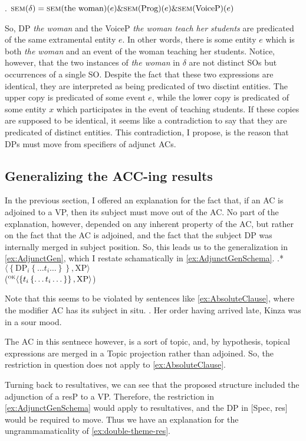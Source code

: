 \documentclass[MilwayThesis]{subfiles}
\begin{document}
\ex.\label{ex:AdjunctSEM} $\textsc{sem}(\delta) = \textsc{sem}(\text{the woman})(e) \& \textsc{sem}(\text{Prog})(e) \& \textsc{sem}(\text{VoiceP})(e)$

So, DP \textit{the woman} and the VoiceP \textit{the woman teach her students} are predicated of the same extramental entity $e$.
In other words, there is some entity $e$ which is both \textit{the woman} and an event of the woman teaching her students.
Notice, however, that the two instances of \textit{the woman} in $\delta$ are not distinct SOs but occurrences of a single SO.
Despite the fact that these two expressions are identical, they are interpreted as being predicated of two disctint entities.
The upper copy is predicated of some event $e$, while the lower copy is predicated of some entity $x$ which participates in the event of teaching students.
If these copies are supposed to be identical, it seems like a contradiction to say that they are predicated of distinct entities.
This contradiction, I propose, is the reason that DPs must move from specifiers of adjunct ACs.
\subsection{Generalizing the ACC-ing results}
In the previous section, I offered an explanation for the fact that, if an AC is adjoined to a VP, then its subject must move out of the AC.
No part of the explanation, however, depended on any inherent property of the AC, but rather on the fact that the AC is adjoined, and the fact that the subject DP was internally merged in subject position. 
So, this leads us to the generalization in \cref{ex:AdjunctGen}, which I restate schamatically in \cref{ex:AdjunctGenSchema}.
\ex.* $\langle \left\{ \text{DP}_{i} \left\{ \dots t_i \dots \right\} \right\}, \text{XP}\rangle$\label{ex:AdjunctGenSchema}\\
($^\textsc{ok}\langle \left\{ t_{i} \left\{ \dots t_i \dots \right\} \right\}, \text{XP}\rangle$)

Note that this seems to be violated by sentences like \cref{ex:AbsoluteClause}, where the modifier AC has its subject in situ.
\ex. Her order having arrived late, Kinza was in a sour mood.\label{ex:AbsoluteClause}

The AC in this sentnece however, is a sort of topic, and, by hypothesis, topical expressions are merged in a Topic projection rather than adjoined.
So, the restriction in question does not apply to \cref{ex:AbsoluteClause}.

Turning back to resultatives, we can see that the proposed structure included the adjunction of a resP to a VP.
Therefore, the restriction in \cref{ex:AdjunctGenSchema} would apply to resultatives, and the DP in [Spec, res] would be required to move.
Thus we have an explanation for the ungrammamaticality of \cref{ex:double-theme-res}. 
\end{document}
